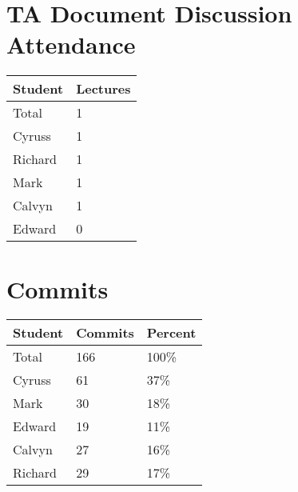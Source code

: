\documentclass{article}
\begin{document}

\section{TA Document Discussion Attendance}


\begin{table}[H]
\centering
\begin{tabular}{ll}
\toprule
\textbf{Student} & \textbf{Lectures}\\
\midrule
Total & 1\\
Cyruss & 1\\
Richard & 1\\
Mark & 1\\
Calvyn & 1\\
Edward & 0\\
\bottomrule
\end{tabular}
\end{table}


\section{Commits}


\begin{table}[H]
\centering
\begin{tabular}{lll}
\toprule
\textbf{Student} & \textbf{Commits} & \textbf{Percent}\\
\midrule
Total & 166 & 100\% \\
Cyruss & 61 & 37\% \\
Mark & 30 & 18\% \\
Edward & 19 & 11\% \\
Calvyn & 27 & 16\% \\
Richard & 29 & 17\% \\
\bottomrule
\end{tabular}
\end{table}
\end{document}
